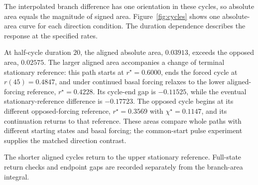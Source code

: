 The interpolated branch difference has one orientation in these cycles, so absolute area equals the magnitude of signed area. Figure~\ref{fig:cycles} shows one absolute-area curve for each direction condition. The duration dependence describes the response at the specified rates.

At half-cycle duration $20$, the aligned absolute area, $0.03913$, exceeds the opposed area, $0.02575$. The larger aligned area accompanies a change of terminal stationary reference: this path starts at $r^\star=0.6000$, ends the forced cycle at $r(45)=0.4847$, and under continued basal forcing relaxes to the lower aligned-forcing reference, $r^\star=0.4228$. Its cycle-end gap is $-0.11525$, while the eventual stationary-reference difference is $-0.17723$. The opposed cycle begins at its different opposed-forcing reference, $r^\star=0.3569$ with $\chi^\star=0.1147$, and its continuation returns to that reference. These areas compare whole paths with different starting states and basal forcing; the common-start pulse experiment supplies the matched direction contrast.

The shorter aligned cycles return to the upper stationary reference. Full-state return checks and endpoint gaps are recorded separately from the branch-area integral.
